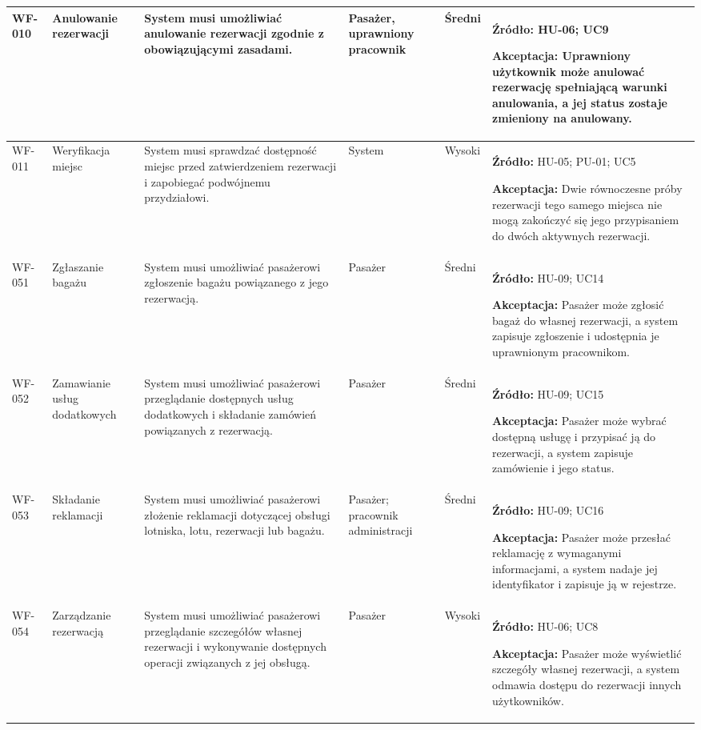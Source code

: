 \documentclass[12pt,a4paper,oneside]{report}
\begin{document}
\begin{longtable}{|p{1.05cm}|p{2.15cm}|p{3.35cm}|p{1.75cm}|p{0.95cm}|p{4.05cm}|}
WF-010 & Anulowanie rezerwacji & System musi umożliwiać anulowanie rezerwacji zgodnie z obowiązującymi zasadami. & Pasażer, uprawniony pracownik & Średni & \textbf{Źródło:} HU-06; UC9\par\textbf{Akceptacja:} Uprawniony użytkownik może anulować rezerwację spełniającą warunki anulowania, a jej status zostaje zmieniony na anulowany.\\\hline
WF-011 & Weryfikacja miejsc & System musi sprawdzać dostępność miejsc przed zatwierdzeniem rezerwacji i zapobiegać podwójnemu przydziałowi. & System & Wysoki & \textbf{Źródło:} HU-05; PU-01; UC5\par\textbf{Akceptacja:} Dwie równoczesne próby rezerwacji tego samego miejsca nie mogą zakończyć się jego przypisaniem do dwóch aktywnych rezerwacji.\\\hline
WF-051 & Zgłaszanie bagażu & System musi umożliwiać pasażerowi zgłoszenie bagażu powiązanego z jego rezerwacją. & Pasażer & Średni & \textbf{Źródło:} HU-09; UC14\par\textbf{Akceptacja:} Pasażer może zgłosić bagaż do własnej rezerwacji, a system zapisuje zgłoszenie i udostępnia je uprawnionym pracownikom.\\\hline
WF-052 & Zamawianie usług dodatkowych & System musi umożliwiać pasażerowi przeglądanie dostępnych usług dodatkowych i składanie zamówień powiązanych z rezerwacją. & Pasażer & Średni & \textbf{Źródło:} HU-09; UC15\par\textbf{Akceptacja:} Pasażer może wybrać dostępną usługę i przypisać ją do rezerwacji, a system zapisuje zamówienie i jego status.\\\hline
WF-053 & Składanie reklamacji & System musi umożliwiać pasażerowi złożenie reklamacji dotyczącej obsługi lotniska, lotu, rezerwacji lub bagażu. & Pasażer; pracownik administracji & Średni & \textbf{Źródło:} HU-09; UC16\par\textbf{Akceptacja:} Pasażer może przesłać reklamację z wymaganymi informacjami, a system nadaje jej identyfikator i zapisuje ją w rejestrze.\\\hline
WF-054 & Zarządzanie rezerwacją & System musi umożliwiać pasażerowi przeglądanie szczegółów własnej rezerwacji i wykonywanie dostępnych operacji związanych z jej obsługą. & Pasażer & Wysoki & \textbf{Źródło:} HU-06; UC8\par\textbf{Akceptacja:} Pasażer może wyświetlić szczegóły własnej rezerwacji, a system odmawia dostępu do rezerwacji innych użytkowników.\\\hline
\end{longtable}
\normalsize
\end{document}

